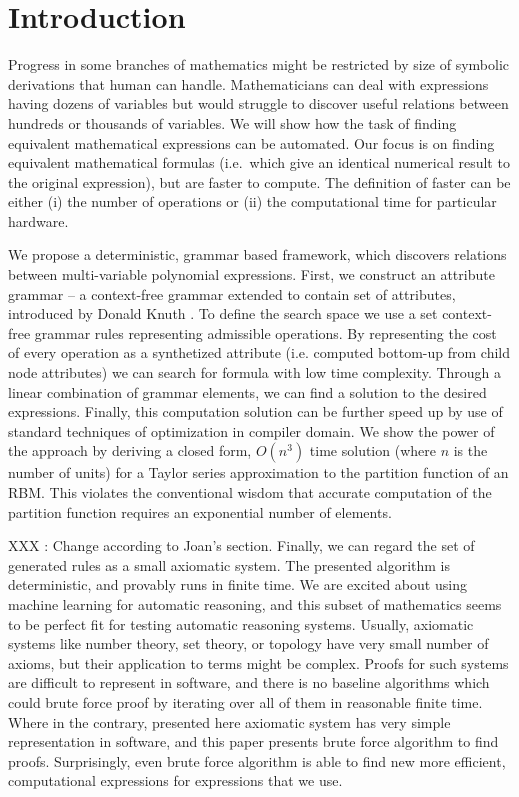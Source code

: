 \section{Introduction} \label{introduction} 

Progress in some branches of
mathematics might be restricted by size of symbolic derivations that human can
handle.  Mathematicians can deal with expressions having dozens of
variables but would struggle to discover useful relations between hundreds or
thousands of variables. We will show how the task of finding equivalent
mathematical expressions can be automated. Our focus is on finding equivalent
mathematical formulas (i.e.~which give an identical numerical result
to the original expression),
but are faster to compute. The definition
of faster can be either (i) the number of operations or (ii) the computational time
for particular hardware.

We propose a deterministic, grammar based framework, which discovers
relations between multi-variable polynomial expressions. First, we
construct an attribute grammar -- a context-free grammar extended to
contain set of attributes, introduced by Donald Knuth
\cite{knuth1968semantics}. To define the search space we use a set
context-free grammar rules representing admissible operations. By
representing the cost of every operation as a synthetized attribute
(i.e. computed bottom-up from child node attributes) we can search for
formula with low time complexity.  Through a linear combination of
grammar elements, we can find a solution to the desired
expressions. Finally, this computation solution can be further speed
up by use of standard techniques of optimization in compiler
domain. We show the power of the approach by deriving a closed form,
$O(n^3)$ time solution (where $n$ is the number of units) for a Taylor
series approximation to the partition function of an RBM. This
violates the conventional wisdom that accurate computation of the
partition function requires an exponential number of elements.


XXX : Change according to Joan's section.
Finally, we can regard the set of generated rules as a small axiomatic system.
The presented algorithm is deterministic, and provably runs in finite
time. We are excited about using machine learning for automatic reasoning, and
this subset of mathematics seems to be perfect fit for testing automatic reasoning systems.
Usually, axiomatic systems like number theory, set theory, or topology have very small
number of axioms, but their application to terms might be complex. Proofs
for such systems are difficult to represent in software, and there is no
baseline algorithms which could brute force proof by iterating over all of them in reasonable finite time.
Where in the contrary, presented here axiomatic system has very simple representation
in software, and this paper presents brute force algorithm to find proofs. 
Surprisingly, even brute force algorithm is able to find new more efficient,
computational expressions for expressions that we use.




